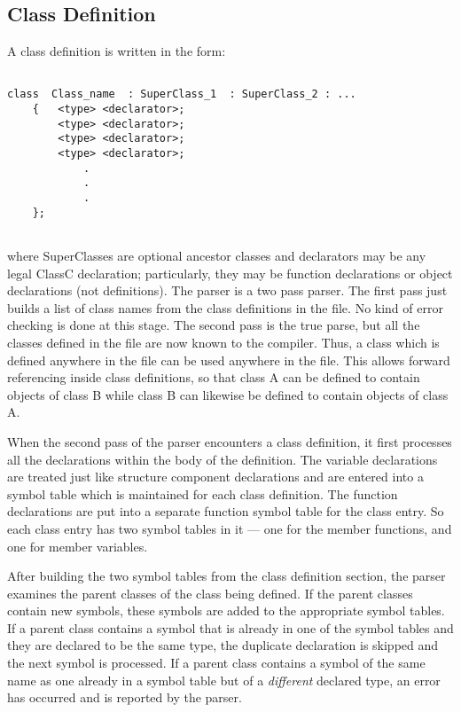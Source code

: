 \subsection{Class Definition}
A class definition is written in the form:
\begin{verbatim}

class  Class_name  : SuperClass_1  : SuperClass_2 : ...
	{	<type> <declarator>;
	 	<type> <declarator>;
	 	<type> <declarator>;
	 	<type> <declarator>;
			.
			.
			.
	};


\end{verbatim}

\noindent
where SuperClasses are optional ancestor classes and declarators may be any
legal ClassC declaration; particularly, they may be function declarations or
object declarations (not definitions).
The parser is a two pass parser.  The first pass just builds a list of class
names from the class definitions in the file.  No kind of error checking is
done at this stage.  The second pass is the true parse, but all the classes
defined in the file are now known to the compiler.  Thus, a class which is
defined anywhere in the file can be used anywhere in the file.  This allows
forward referencing inside class definitions, so that class A can be
defined to contain objects of class B while class B can likewise
be defined to contain objects of class A.

When the second pass of the parser encounters a class definition, it
first processes all the declarations within the body of the definition.
The variable declarations are treated just like structure component
declarations and are entered into a symbol table which is maintained for
each class definition.  The function declarations are put into a separate
function symbol table for the class entry.  So each class entry has two
symbol tables in it --- one for the member functions, and one for member
variables.

After building the two symbol tables from the class definition section, the
parser examines the parent classes of the class being defined.  If the
parent classes contain new symbols, these symbols are added to the
appropriate symbol tables.  If a parent class contains a symbol that
is already in one of the symbol tables and they are
declared to be the same type,
the duplicate declaration is skipped and the next symbol is processed.  If
a parent class contains a symbol of the same name as one already in a symbol
table but of a {\em different} declared type, an error has occurred and is reported by the parser.

